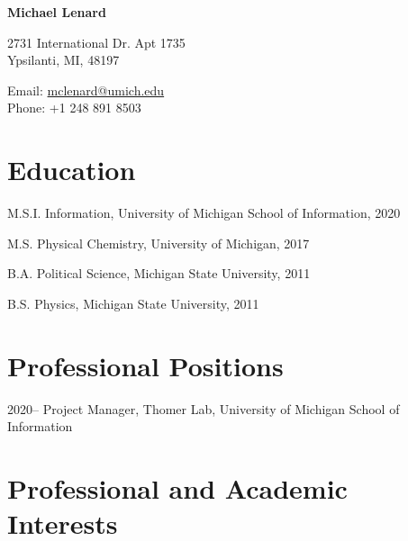 \documentclass[12pt,letterpaper]{report}
\newcommand{\myname}{Michael Lenard}
\newcommand{\namefont}[1]{{\normalfont\bfseries\Huge{#1}}}
\begin{document}
 \raggedright

\namefont{\myname}

\vspace{1em}
\begin{minipage}[t]{0.68\textwidth}
        2731 International Dr. Apt 1735 \\
Ypsilanti, MI, 48197
\end{minipage}
\begin{minipage}[t]{0.31\textwidth}
        Email: \href{mailto:mclenard@umich.edu}{mclenard@umich.edu} \\
        Phone: +1 248 891 8503
\end{minipage}
\vspace{0.5em}



\section*{Education}

\begin{tablist}

	\item[M.S.I.] \tab Information, University of Michigan School of Information, 2020

	\item[M.S.]  \tab Physical Chemistry, University of Michigan, 2017

	\item[B.A.]  \tab Political Science, Michigan State University, 2011
        
	\item[B.S.]  \tab Physics, Michigan State University, 2011

\end{tablist}



\section*{Professional Positions}

\begin{tablist}

\item[2020--] \tab Project Manager, Thomer Lab, University of Michigan School of Information

\end{tablist}



\section*{Professional and Academic Interests}
\end{document}
